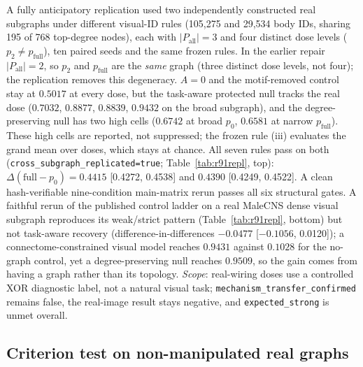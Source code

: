 \documentclass[10pt,twocolumn,letterpaper]{article}
\begin{document}
A fully anticipatory replication used two independently constructed real
subgraphs under different visual-ID rules (105{,}275 and 29{,}534 body IDs,
sharing 195 of 768 top-degree nodes), each with $|P_{\mathrm{all}}|{=}3$ and
four distinct dose levels ($p_2\!\neq\!p_{\mathrm{full}}$), ten paired seeds
and the same frozen rules. In the earlier repair $|P_{\mathrm{all}}|{=}2$, so
$p_2$ and $p_{\mathrm{full}}$ are the \emph{same} graph (three distinct dose
levels, not four); the replication removes this degeneracy. $A{=}0$ and the
motif-removed control stay at $0.5017$ at every dose, but the task-aware
protected null tracks the real dose ($0.7032$, $0.8877$, $0.8839$, $0.9432$
on the broad subgraph), and the degree-preserving null has two high cells
($0.6742$ at broad $p_0$, $0.6581$ at narrow $p_{\mathrm{full}}$). These high
cells are reported, not suppressed; the frozen rule (iii) evaluates the grand
mean over doses, which stays at chance. All seven rules pass on both
(\texttt{cross\_subgraph\_replicated=true}; Table~\ref{tab:r91repl}, top):
$\Delta(\mathrm{full}\!-\!p_0)=0.4415$ [0.4272, 0.4538] and $0.4390$
[0.4249, 0.4522]. A clean hash-verifiable nine-condition main-matrix rerun
passes all six structural gates. A faithful rerun of the published control
ladder on a real MaleCNS dense visual subgraph reproduces its weak/strict
pattern (Table~\ref{tab:r91repl}, bottom) but not task-aware recovery
(difference-in-differences $-0.0477$ [$-0.1056$, 0.0120]); a
connectome-constrained visual model reaches $0.9431$ against $0.1028$ for the
no-graph control, yet a degree-preserving null reaches $0.9509$, so the gain
comes from having a graph rather than its topology. \emph{Scope}: real-wiring
doses use a controlled XOR diagnostic label, not a natural visual task;
\texttt{mechanism\_transfer\_confirmed} remains false, the real-image result
stays negative, and \texttt{expected\_strong} is unmet overall.

\subsection{Criterion test on non-manipulated real graphs}
\label{sec:criteriontest}
\end{document}
